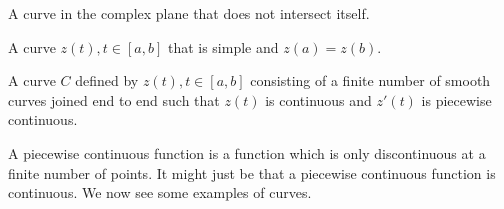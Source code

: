 \documentclass[12pt]{book}
\begin{document}
\begin{defn}
    A curve in the complex plane that does not intersect itself.
\end{defn}

\begin{defn}
    A curve $z(t), t \in [a, b]$ that is simple and $z(a) = z(b).$
\end{defn}

\begin{defn}[Contour]
    A curve $C$ defined by $z(t), t \in [a, b]$ consisting of a finite number of smooth curves joined end to end such that $z(t)$ is continuous and $z'(t)$ is piecewise continuous.  
\end{defn}
A piecewise continuous function is a function which is only discontinuous at a finite number of points. It might just be that a piecewise continuous function is continuous. We now see some examples of curves.
\end{document}
